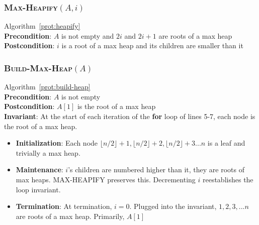 \documentclass[onecolumn, letterpaper, 12pt]{article}
\begin{document}
		\subsubsection{\textsc{Max-Heapify}$(A, i)$}
			\footnotesize
			Algorithm~\ref{prot:heapify}\\
			\textbf{Precondition}: $A$ is not empty and $2i$ and $2i+1$ are roots of a max heap\\
			\textbf{Postcondition}: $i$ is a root of a max heap and its children are smaller than it
			\normalsize
		\subsubsection{\textsc{Build-Max-Heap}$(A)$}
			\footnotesize
			Algorithm~\ref{prot:build-heap}\\
			\textbf{Precondition}: $A$ is not empty\\
			\textbf{Postcondition}: $A[1]$ is the root of a max heap\\
			\textbf{Invariant}: At the start of each iteration of the \textbf{for} loop of lines 5-7, each node is the root of a max heap.
			\begin{itemize}
				\item \textbf{Initialization}: Each node $\lfloor n/2\rfloor + 1,\lfloor n/2\rfloor + 2,\lfloor n/2\rfloor + 3...n$ is a leaf and trivially a max heap.
				\item \textbf{Maintenance}: $i$'s children are numbered higher than it, they are roots of max heaps. \textsc{MAX-HEAPIFY} preserves this. Decrementing $i$ reestablishes the loop invariant. 
				\item \textbf{Termination}: At termination, $i=0$. Plugged into the invariant, $1,2,3,...n$ are roots of a max heap. Primarily, $A[1]$
			\end{itemize}
			\normalsize
\end{document}
